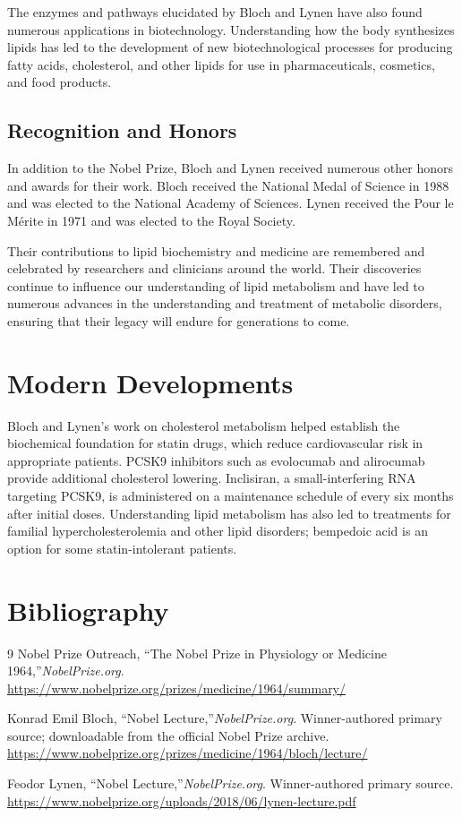 The enzymes and pathways elucidated by Bloch and Lynen have also found numerous applications in biotechnology. Understanding how the body synthesizes lipids has led to the development of new biotechnological processes for producing fatty acids, cholesterol, and other lipids for use in pharmaceuticals, cosmetics, and food products.

\subsection{Recognition and Honors}

In addition to the Nobel Prize, Bloch and Lynen received numerous other honors and awards for their work. Bloch received the National Medal of Science in 1988 and was elected to the National Academy of Sciences. Lynen received the Pour le M\'erite in 1971 and was elected to the Royal Society.

Their contributions to lipid biochemistry and medicine are remembered and celebrated by researchers and clinicians around the world. Their discoveries continue to influence our understanding of lipid metabolism and have led to numerous advances in the understanding and treatment of metabolic disorders, ensuring that their legacy will endure for generations to come.


\section{Modern Developments}

Bloch and Lynen's work on cholesterol metabolism helped establish the biochemical foundation for statin drugs, which reduce cardiovascular risk in appropriate patients. PCSK9 inhibitors such as evolocumab and alirocumab provide additional cholesterol lowering. Inclisiran, a small-interfering RNA targeting PCSK9, is administered on a maintenance schedule of every six months after initial doses. Understanding lipid metabolism has also led to treatments for familial hypercholesterolemia and other lipid disorders; bempedoic acid is an option for some statin-intolerant patients.


\section{Bibliography}

\begin{thebibliography}{9}
Nobel Prize Outreach, ``The Nobel Prize in Physiology or Medicine 1964,''\emph{NobelPrize.org}.\\
\url{https://www.nobelprize.org/prizes/medicine/1964/summary/}

Konrad Emil Bloch, ``Nobel Lecture,''\emph{NobelPrize.org}. Winner-authored primary source; downloadable from the official Nobel Prize archive.\\
\url{https://www.nobelprize.org/prizes/medicine/1964/bloch/lecture/}

Feodor Lynen, ``Nobel Lecture,''\emph{NobelPrize.org}. Winner-authored primary source.\\
\url{https://www.nobelprize.org/uploads/2018/06/lynen-lecture.pdf}
\end{thebibliography}
